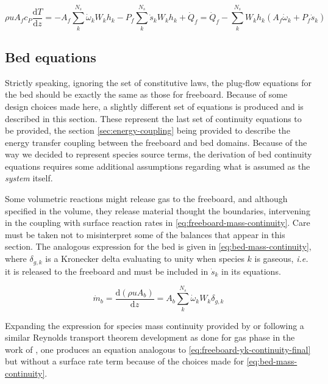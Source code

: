 \documentclass[11pt]{paper}
\begin{document}
\begin{equation}
\rho{}uA_{f}c_{P}\frac{\mathrm{d}T}{\mathrm{d}z}=
-A_{f}\sum_{k}^{N_s}\dot{\omega}_{k}W_{k}h_{k}
-P_{f}\sum_{k}^{N_s}\dot{s}_{k}W_{k}h_{k}
+\dot{Q}_{f}=
\dot{Q}_{f}-\sum_{k}^{N_s}W_{k}h_{k}
\left(A_{f}\dot{\omega}_{k}+P_{f}\dot{s}_{k}\right)
\label{eq:freeboard-continuity-energy}
\end{equation}

\subsection{Bed equations}

Strictly speaking, ignoring the set of constitutive laws, the plug-flow equations for the bed should be exactly the same as those for freeboard. Because of some design choices made here, a slightly different set of equations is produced and is described in this section. These represent the last set of continuity equations to be provided, the section \ref{sec:energy-coupling} being provided to describe the energy transfer coupling between the freeboard and bed domains. Because of the way we decided to represent species source terms, the derivation of bed continuity equations requires some additional assumptions regarding what is assumed as the \emph{system} itself.

Some volumetric reactions might release gas to the freeboard, and although specified in the volume, they release material thought the boundaries, intervening in the coupling with surface reaction rates in \eqref{eq:freeboard-mass-continuity}. Care must be taken not to misinterpret some of the balances that appear in this section. The analogous expression for the bed is given in \eqref{eq:bed-mass-continuity}, where $\delta_{g,k}$ is a Kronecker delta evaluating to unity when species $k$ is gaseous, \emph{i.e.} it is released to the freeboard and must be included in $\dot{s}_{k}$ in its equations.

\begin{equation}
\dot{m}_{b}
=\frac{\mathrm{d}(\rho{}uA_{b})}{\mathrm{d}z}
=A_{b}\sum_{k}^{N_s}\dot{\omega}_{k}W_{k}\delta_{g,k}
\label{eq:bed-mass-continuity}
\end{equation}

Expanding the expression for species mass continuity provided by \textcite{Mujumdar2006i} or following a similar Reynolds transport theorem development as done for gas phase in the work of \textcite{Kee2017}, one produces an equation analogous to \eqref{eq:freeboard-yk-continuity-final} but without a surface rate term because of the choices made for \eqref{eq:bed-mass-continuity}.
\end{document}
